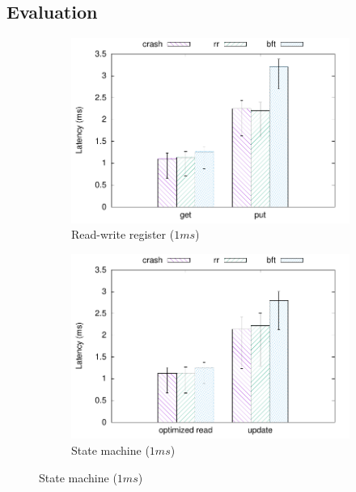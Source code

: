 \subsection{Evaluation}\label{sec:eval}

\begin{figure}[th!]
    \centering
    \begin{subfigure}[t]{0.24 * 10cm}
        \includegraphics[width=\linewidth]{teem_results/protocol/1ms/lat/1ms_reg}
        \caption{Read-write register ($1ms$)}\label{fig:1ms_reg_lat}
    \end{subfigure}
    \begin{subfigure}[t]{0.24 * 10cm}
        \includegraphics[width=\linewidth]{teem_results/protocol/1ms/lat/1ms_smr}
        \caption{State machine ($1ms$)}\label{fig:1ms_smr_lat}
    \end{subfigure}

\end{figure}
